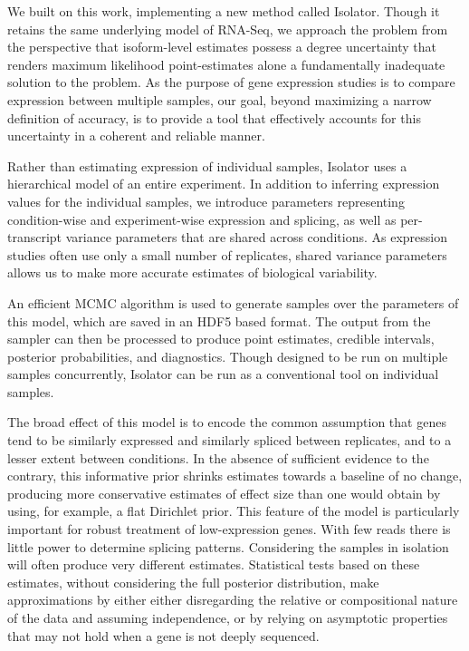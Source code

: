 \documentclass[twocolumn]{article}
\begin{document}
We built on this work, implementing a new method called Isolator. Though
it retains the same underlying model of RNA-Seq, we approach the problem
from the perspective that isoform-level estimates possess a degree
uncertainty that renders maximum likelihood point-estimates alone a
fundamentally inadequate solution to the problem. As the purpose of gene
expression studies is to compare expression between multiple samples,
our goal, beyond maximizing a narrow definition of accuracy, is to
provide a tool that effectively accounts for this uncertainty in a
coherent and reliable manner.

Rather than estimating expression of individual samples, Isolator uses a
hierarchical model of an entire experiment. In addition to inferring
expression values for the individual samples, we introduce parameters
representing condition-wise and experiment-wise expression and splicing,
as well as per-transcript variance parameters that are shared across
conditions. As expression studies often use only a small number of
replicates, shared variance parameters allows us to make more accurate
estimates of biological variability.

An efficient MCMC algorithm is used to generate samples over the
parameters of this model, which are saved in an HDF5 based format. The
output from the sampler can then be processed to produce point
estimates, credible intervals, posterior probabilities, and diagnostics.
Though designed to be run on multiple samples concurrently, Isolator can
be run as a conventional tool on individual samples.

The broad effect of this model is to encode the common assumption that
genes tend to be similarly expressed and similarly spliced between
replicates, and to a lesser extent between conditions. In the absence of
sufficient evidence to the contrary, this informative prior shrinks
estimates towards a baseline of no change, producing more conservative
estimates of effect size than one would obtain by using, for example, a
flat Dirichlet prior. This feature of the model is particularly
important for robust treatment of low-expression genes. With few reads
there is little power to determine splicing patterns. Considering the
samples in isolation will often produce very different estimates.
Statistical tests based on these estimates, without considering the full
posterior distribution, make approximations by either either
disregarding the relative or compositional nature of the data and
assuming independence, or by relying on asymptotic properties that may
not hold when a gene is not deeply sequenced.
\end{document}
